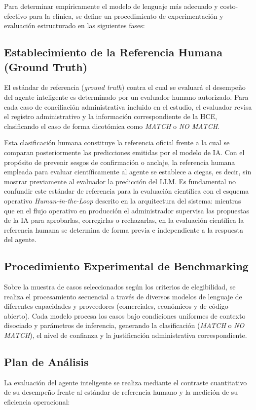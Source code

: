 Para determinar empíricamente el modelo de lenguaje más adecuado y costo-efectivo para la clínica, se define un procedimiento de experimentación y evaluación estructurado en las siguientes fases:

\subsection{Establecimiento de la Referencia Humana (Ground Truth)}
El estándar de referencia (\textit{ground truth}) contra el cual se evaluará el desempeño del agente inteligente es determinado por un evaluador humano autorizado. Para cada caso de conciliación administrativa incluido en el estudio, el evaluador revisa el registro administrativo y la información correspondiente de la HCE, clasificando el caso de forma dicotómica como \textit{MATCH} o \textit{NO MATCH}.

Esta clasificación humana constituye la referencia oficial frente a la cual se comparan posteriormente las predicciones emitidas por el modelo de IA. Con el propósito de prevenir sesgos de confirmación o anclaje, la referencia humana empleada para evaluar científicamente al agente se establece a ciegas, es decir, sin mostrar previamente al evaluador la predicción del LLM. Es fundamental no confundir este estándar de referencia para la evaluación científica con el esquema operativo \textit{Human-in-the-Loop} descrito en la arquitectura del sistema: mientras que en el flujo operativo en producción el administrador supervisa las propuestas de la IA para aprobarlas, corregirlas o rechazarlas, en la evaluación científica la referencia humana se determina de forma previa e independiente a la respuesta del agente.

\subsection{Procedimiento Experimental de Benchmarking}
Sobre la muestra de casos seleccionados según los criterios de elegibilidad, se realiza el procesamiento secuencial a través de diversos modelos de lenguaje de diferentes capacidades y proveedores (comerciales, económicos y de código abierto). Cada modelo procesa los casos bajo condiciones uniformes de contexto disociado y parámetros de inferencia, generando la clasificación (\textit{MATCH} o \textit{NO MATCH}), el nivel de confianza y la justificación administrativa correspondiente.

\subsection{Plan de Análisis}
La evaluación del agente inteligente se realiza mediante el contraste cuantitativo de su desempeño frente al estándar de referencia humano y la medición de su eficiencia operacional:

